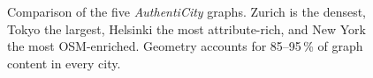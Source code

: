 \documentclass[sigconf,authordraft]{acmart}
\newcommand{\benchname}{\textit{Authenti\-City}}
\begin{document}
\begin{figure}[h!]
\begin{minipage}[t]{0.5\textwidth}
  \end{minipage}
  \caption{
    Comparison of the five \benchname{} graphs. Zurich is the densest, Tokyo the largest, Helsinki the most attribute-rich, and New York the most OSM-enriched. Geometry accounts for 85--95\,\% of graph content in every city. 
}
\end{figure}
\end{document}
